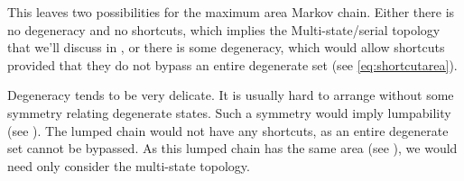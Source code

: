 \documentclass{article} %
\newcommand{\W}{\mathbf{W}}
\newcommand{\pot}{^{\text{pot}}}
\newcommand{\dep}{^{\text{dep}}}
\newcommand{\potdep}{^{\text{pot/dep}}}
\begin{document}
%

This leaves two possibilities for the maximum area Markov chain.
Either there is no degeneracy and no shortcuts, which implies the Multi-state/serial topology that we'll discuss in , or there is some degeneracy, which would allow shortcuts provided that they do not bypass an entire degenerate set (see \eqref{eq:shortcutarea}).

Degeneracy tends to be very delicate. It is usually hard to arrange without some symmetry relating degenerate states. Such a symmetry would imply lumpability (see ). The lumped chain would not have any shortcuts, as an entire degenerate set cannot be bypassed. As this lumped chain has the same area (see ), we would need only consider the multi-state topology.
\end{document}
